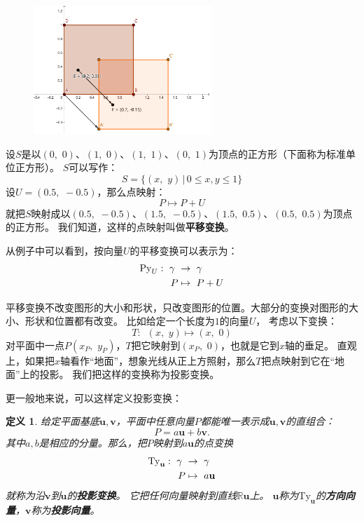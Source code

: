 \documentclass[12pt,UTF8]{ctexbook}
\newtheorem{df}{定义}[section]
\begin{document}
\begin{figure}[h] %
    \vspace{4pt}
    \centering
    \includegraphics[width=0.6\textwidth]{平移变换例2.png}
\end{figure}

设$S$是以$(0,\,\,0)$、$(1,\,\,0)$、$(1,\,\,1)$、$(0,\,\,1)$为顶点的正方形（下面称为标准单位正方形）。
$S$可以写作：
$$ S = \{ (x,\,\, y) \, | \, 0\leqslant x, y \leqslant 1\} $$
设$U = (0.5, \,\, -0.5)$，那么点映射：
$$ P \mapsto P + U $$
就把$S$映射成以$(0.5,\,\,-0.5)$、$(1.5,\,\,-0.5)$、$(1.5,\,\,0.5)$、$(0.5,\,\,0.5)$为顶点的正方形。
我们知道，这样的点映射叫做\textbf{平移变换}。

从例子中可以看到，按向量$U$的平移变换可以表示为：
\begin{align}
    \mathrm{Py}_U : \,\, \gamma\,\,&\rightarrow \,\, \gamma \notag \\
    P &\mapsto \,\, P + U \notag
\end{align}

平移变换不改变图形的大小和形状，只改变图形的位置。大部分的变换对图形的大小、形状和位置都有改变。
比如给定一个长度为$1$的向量$U$，
考虑以下变换：
$$ T: \,\,\, (x, \,\, y) \mapsto (x,\,\, 0)$$
对平面中一点$P(x_P, \,\, y_P)$，$T$把它映射到$(x_P,\,\,0)$，也就是它到$x$轴的垂足。
直观上，如果把$x$轴看作“地面”，想象光线从正上方照射，那么$T$把点映射到它在“地面”上的投影。
我们把这样的变换称为投影变换。

更一般地来说，可以这样定义投影变换：
\begin{df}
    给定平面基底$\mathbf{u}, \mathbf{v}$，平面中任意向量$P$都能唯一表示成$\mathbf{u}, \mathbf{v}$的直组合：
    $$ P = a\mathbf{u} + b\mathbf{v}.$$
    其中$a, b$是相应的分量。那么，把$P$映射到$a\mathbf{u}$的点变换
    \begin{align}
        \mathrm{Ty}_\mathbf{u} : \,\, \gamma\,\,&\rightarrow \,\, \gamma \notag \\
        P &\mapsto \,\, a\mathbf{u} \notag
    \end{align}
    就称为沿$\mathbf{v}$到$\mathbf{u}$的\textbf{投影变换}。
    它把任何向量映射到直线$\mathbb{R}\mathbf{u}$上。
    $\mathbf{u}$称为$\mathrm{Ty}_\mathbf{u}$的\textbf{方向向量}，$\mathbf{v}$称为\textbf{投影向量}。
\end{df}
\end{document}
